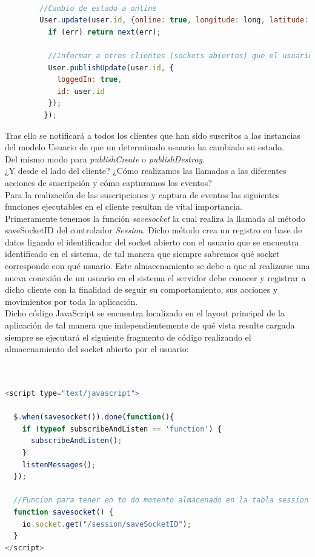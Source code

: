 \begin{lstlisting}[language=JavaScript]

        //Cambio de estado a online
        User.update(user.id, {online: true, longitude: long, latitude: lat}, function (err){
          if (err) return next(err);

          //Informar a otros clientes (sockets abiertos) que el usuario esta logueado
          User.publishUpdate(user.id, {
            loggedIn: true,
            id: user.id
          });
         });

\end{lstlisting}

Tras ello se notificará a todos los clientes que han sido suscritos a las instancias del modelo Usuario de que un determinado usuario ha cambiado su estado.\\

Del mismo modo para \emph{publishCreate} o \emph{publishDestroy}.\\

¿Y desde el lado del cliente? ¿Cómo realizamos las llamadas a las diferentes acciones de suscripción y cómo capturamos los eventos?\\

Para la realización de las suscripciones y captura de eventos las siguientes funciones ejecutables en el cliente resultan de vital importancia.\\

Primeramente tenemos la función \emph{savesocket} la cual realiza la llamada al método saveSocketID del controlador \emph{Session}. Dicho método crea un registro en base de datos ligando el
identificador del socket abierto con el usuario que se encuentra identificado en el sistema, de tal manera que siempre sabremos qué socket corresponde con qué usuario. Este almacenamiento se debe
a que al realizarse una nueva conexión de un usuario en el sistema el servidor debe conocer y registrar a dicho cliente con la finalidad de seguir su comportamiento, sus acciones y movimientos por toda
la aplicación.\\

Dicho código JavaScript se encuentra localizado en el layout principal de la aplicación de tal manera que independientemente de qué vista resulte cargada siempre se ejecutará el siguiente fragmento
de código realizando el almacenamiento del socket abierto por el usuario:\\

\begin{lstlisting}[language=JavaScript]


<script type="text/javascript">

  $.when(savesocket()).done(function(){
    if (typeof subscribeAndListen == 'function') {
      subscribeAndListen();
    }
    listenMessages();
  });

  //Funcion para tener en to do momento almacenado en la tabla session los sockets conectados junto con el usuario al que pertenece
  function savesocket() {
    io.socket.get("/session/saveSocketID");
  }
</script>

\end{lstlisting}


